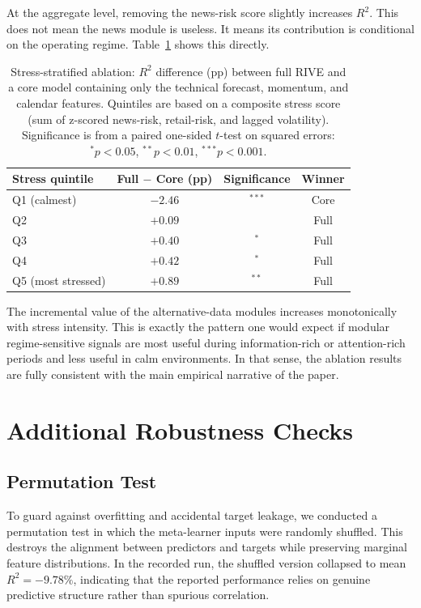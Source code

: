 \documentclass[review]{elsarticle}
\begin{document}
At the aggregate level, removing the news-risk score slightly increases $R^2$. This does not mean the news module is useless. It means its contribution is conditional on the operating regime. Table~\ref{tab:stress-quintile} shows this directly.

\begin{table}[H]
\centering
\caption{Stress-stratified ablation: $R^2$ difference (pp) between full RIVE and a core model containing only the technical forecast, momentum, and calendar features. Quintiles are based on a composite stress score (sum of z-scored news-risk, retail-risk, and lagged volatility). Significance is from a paired one-sided $t$-test on squared errors: $^{*}p<0.05$, $^{**}p<0.01$, $^{***}p<0.001$.}
\label{tab:stress-quintile}
\begin{tabular}{lccc}
\toprule
Stress quintile & Full $-$ Core (pp) & Significance & Winner \\
\midrule
Q1 (calmest) & $-2.46$ & $^{***}$ & Core \\
Q2 & $+0.09$ &  & Full \\
Q3 & $+0.40$ & $^{*}$ & Full \\
Q4 & $+0.42$ & $^{*}$ & Full \\
Q5 (most stressed) & $+0.89$ & $^{**}$ & Full \\
\bottomrule
\end{tabular}
\end{table}

The incremental value of the alternative-data modules increases monotonically with stress intensity. This is exactly the pattern one would expect if modular regime-sensitive signals are most useful during information-rich or attention-rich periods and less useful in calm environments. In that sense, the ablation results are fully consistent with the main empirical narrative of the paper.

\section{Additional Robustness Checks}\label{sec:robustness}

\subsection{Permutation Test}\label{sec:validation-suite}

To guard against overfitting and accidental target leakage, we conducted a permutation test in which the meta-learner inputs were randomly shuffled. This destroys the alignment between predictors and targets while preserving marginal feature distributions. In the recorded run, the shuffled version collapsed to mean $R^2=-9.78\%$, indicating that the reported performance relies on genuine predictive structure rather than spurious correlation.
\end{document}

